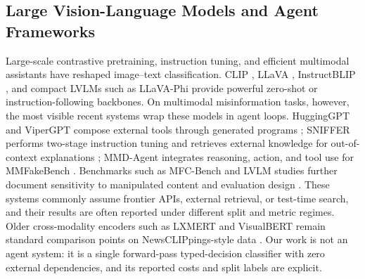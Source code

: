 \documentclass{article} %
\begin{document}
\subsection{Large Vision-Language Models and Agent Frameworks}
Large-scale contrastive pretraining, instruction tuning, and efficient multimodal assistants have reshaped image--text classification. CLIP \citep{Radford2021LearningTransferable}, LLaVA \citep{Liu2023VisualInstruction}, InstructBLIP \citep{Dai2023InstructblipTowards}, and compact LVLMs such as LLaVA-Phi \citep{Zhu2024LlavaphiEfficient} provide powerful zero-shot or instruction-following backbones. On multimodal misinformation tasks, however, the most visible recent systems wrap these models in agent loops. HuggingGPT and ViperGPT compose external tools through generated programs \citep{Shen2023HugginggptSolving, Surs2023VipergptVisual}; SNIFFER performs two-stage instruction tuning and retrieves external knowledge for out-of-context explanations \citep{Qi2024SnifferMultimodal}; MMD-Agent integrates reasoning, action, and tool use for MMFakeBench \citep{Liu2024MmfakebenchMixedsource}. Benchmarks such as MFC-Bench and LVLM studies further document sensitivity to manipulated content and evaluation design \citep{Wang2024MfcbenchBenchmarking, Tahmasebi2024MultimodalMisinformation}. These systems commonly assume frontier APIs, external retrieval, or test-time search, and their results are often reported under different split and metric regimes. Older cross-modality encoders such as LXMERT and VisualBERT remain standard comparison points on NewsCLIPpings-style data \citep{Tan2019LxmertLearning, Li2019VisualbertSimple}. Our work is not an agent system: it is a single forward-pass typed-decision classifier with zero external dependencies, and its reported costs and split labels are explicit.
\end{document}
